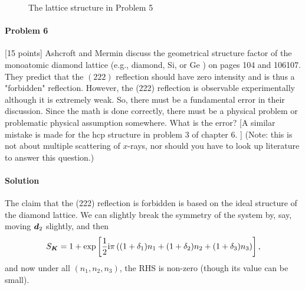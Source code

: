 \documentclass[hyperref, a4paper]{article}
\newcommand*{\ii}{\mathrm{i}}
\begin{document}
\begin{figure}
    \centering
    
    \caption{The lattice structure in Problem 5}
\end{figure}

\paragraph{Problem 6} [15 points] Ashcroft and Mermin discuss the geometrical structure factor of the monoatomic diamond lattice (e.g., diamond, Si, or $\mathrm{Ge}$ ) on pages 104 and 106107. They predict that the $(222)$ reflection should have zero intensity and is thus a "forbidden" reflection. However, the (222) reflection is observable experimentally although it is extremely weak. So, there must be a fundamental error in their discussion. Since the math is done correctly, there must be a physical problem or problematic physical assumption somewhere. What is the error? [A similar mistake is made for the hcp structure in problem 3 of chapter $6 .$ ] (Note: this is not about multiple scattering of $x$-rays, nor should you have to look up literature to answer this question.)

\paragraph{Solution} The claim that the (222) reflection is forbidden 
is based on the ideal structure of the diamond lattice.
We can slightly break the symmetry of the system by, say,
moving $\vb*{d}_2$ slightly, and then 
\[
    S_{\vb*{K}}=1+\exp \left[\frac{1}{2} \ii \pi\left( (1 + \delta_1) n_1+ (1 + \delta_2) n_2+ (1 + \delta_3) n_3\right)\right],
\]
and now under all $(n_1, n_2, n_3)$,
the RHS is non-zero (though its value can be small).
\end{document}
